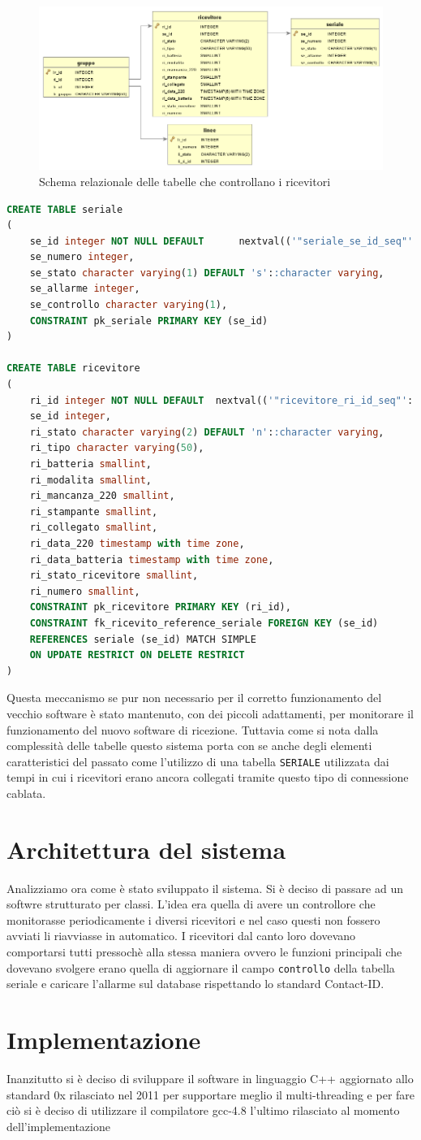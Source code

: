 \begin{figure}
	\centering
	\includegraphics[width=0.7\linewidth]{pictures/erricevitori.png}
	\caption{Schema relazionale delle tabelle che controllano i ricevitori}\label{fig:erricevitori}
\end{figure}
\begin{lstlisting}[language=SQL,caption=Tabelle ricevitori,label=lst:ricevitori]
CREATE TABLE seriale
(
	se_id integer NOT NULL DEFAULT 		nextval(('"seriale_se_id_seq"'::text)::regclass),
	se_numero integer,
	se_stato character varying(1) DEFAULT 's'::character varying,
	se_allarme integer,
	se_controllo character varying(1),
	CONSTRAINT pk_seriale PRIMARY KEY (se_id)
)

CREATE TABLE ricevitore
(
	ri_id integer NOT NULL DEFAULT 	nextval(('"ricevitore_ri_id_seq"'::text)::regclass),
	se_id integer,
	ri_stato character varying(2) DEFAULT 'n'::character varying,
	ri_tipo character varying(50),
	ri_batteria smallint,
	ri_modalita smallint,
	ri_mancanza_220 smallint,
	ri_stampante smallint,
	ri_collegato smallint,
	ri_data_220 timestamp with time zone,
	ri_data_batteria timestamp with time zone,
	ri_stato_ricevitore smallint,
	ri_numero smallint,
	CONSTRAINT pk_ricevitore PRIMARY KEY (ri_id),
	CONSTRAINT fk_ricevito_reference_seriale FOREIGN KEY (se_id)
	REFERENCES seriale (se_id) MATCH SIMPLE
	ON UPDATE RESTRICT ON DELETE RESTRICT
)
\end{lstlisting}
Questa meccanismo se pur non necessario per il corretto funzionamento del vecchio software è stato mantenuto, con dei piccoli adattamenti, per monitorare il funzionamento del nuovo software di ricezione.
Tuttavia come si nota dalla complessità delle tabelle questo sistema porta con se anche degli elementi caratteristici del passato come l'utilizzo di una tabella \texttt{SERIALE} utilizzata dai tempi in cui i ricevitori erano ancora collegati tramite questo tipo di connessione cablata.

\section{Architettura del sistema}
Analizziamo ora come è stato sviluppato il sistema. Si è deciso di passare ad un softwre strutturato per classi. L'idea era quella di avere un controllore che monitorasse periodicamente i diversi ricevitori e nel caso questi non fossero avviati li riavviasse in automatico. I ricevitori dal canto loro dovevano comportarsi tutti pressochè alla stessa maniera ovvero le funzioni principali che dovevano svolgere erano quella di aggiornare il campo \texttt{controllo} della tabella seriale e caricare l'allarme sul database rispettando lo standard Contact-ID.
\section{Implementazione}
Inanzitutto si è deciso di sviluppare il software in linguaggio C++ aggiornato allo standard 0x rilasciato nel 2011 per supportare meglio il multi-threading e per fare ciò si è deciso di utilizzare il compilatore gcc-4.8 l'ultimo rilasciato al momento dell'implementazione